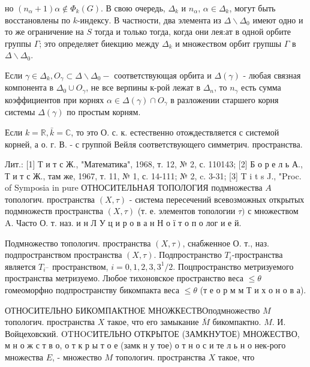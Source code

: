 \documentclass[10pt]{article}
\begin{document}
но $\left(n_{\alpha}+1\right) \alpha \notin \Phi_{k}(G)$. В свою очередь, $\Delta_{k}$ и $n_{\alpha}$, $\alpha \in \Delta_{k}$, могут быть восстановлены по $k$-индексу. В частности, два элемента из $\Delta \backslash \Delta_{0}$ имеют одно и то же ограничение на $S$ тогда и только тогда, когда они лея:ат в одной орбите группы $\Gamma$; это определяет биекцию между $\Delta_{k}$ и множеством орбит групшы $\Gamma$ в $\Delta \backslash \Delta_{0}$.



Если $\gamma \in \Delta_{k}, O_{\gamma} \subset \Delta \backslash \Delta_{0}-$ соответствующая орбита и $\Delta(\gamma)$ - любая связная компонента в $\Delta_{0} \cup O_{\gamma}$, не все верпины к-рой лежат в $\Delta_{n}$, то $n_{\gamma}$ есть сумма коэффициентов при корнях $\alpha \in \Delta(\gamma) \cap O_{\gamma}$ в разложении старшего корня системы $\Delta(\gamma)$ по простым корням.



Если $k=\mathbb{R}, \bar{k}=\mathbb{C}$, то это О. с. к. естественно отождествляется с системой корней, а о. г. В. - с группой Вейля соответствующего симметрич. пространства.



Лит.: [1] Т и т с Ж., "Математика", 1968, т. 12, № 2, с. 110143; [2] Б о р е л ь А., Т и т с Ж., там же, 1967, т. 11, № 1, с. 14-111; № 2, c. 3-31; [3] T i t s J., "Proc. of Symposia in pure ОТНОСИТЕЛЬНАЯ ТОПОЛОГИЯ подмножества $A$ топологич. пространства $(X, \tau)$ - система пересечений всевозможных открытых подмножеств пространства $(X, \tau)$ (т. е. элементов топологии $\tau)$ с множеством A. Часто О. т. наз. и н Л У ц и р о в а н Н о ї т о п о лог и е й.



Подмножество топологич. пространства $(X, \tau)$, снабженное О. т., наз. подпространством пространства $(X, \tau)$. Подпространство $T_{i}$-пространства является $T_{i^{-}}$ пространством, $i=0,1,2,3,3^{1} / 2$. Поцпространство метризуемого пространства метризуемо. Любое тихоновское пространство веса $\leqslant \theta$ гомеоморфно подпространству бикомпакта веса $\leqslant \theta$ (т е о р м м Т и х о н о в а).



ОТНОСИТЕЛЬНО БИКОМПАКТНОЕ МНОЖКЕСТВОподмножество $M$ топологич. пространства $X$ такое, что его замыкание $\bar{M}$ бикомпактно. $M$. И. Войцеховский. OTHOCИТЕЛЬНО ОТКРЫТОЕ (ЗАМКНУТОЕ) МНОЖЕСТВО, м н о ж с т в о, о т к р ы т о е (замк н у тое) о т н о с и те л ь н о нек-рого множества $E$, - множество $M$ топологич. пространства $X$ такое, что
\end{document}
